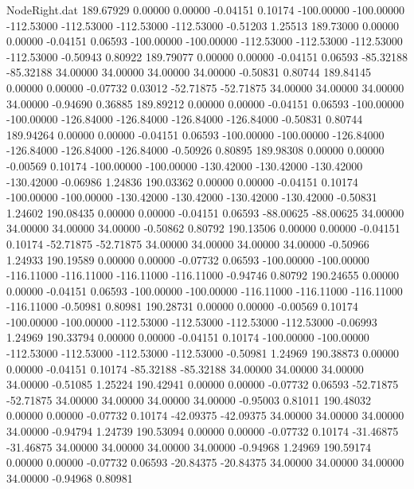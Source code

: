 \begin{filecontents}{NodeRight.dat}
 189.67929    0.00000    0.00000    -0.04151    0.10174 -100.00000 -100.00000 -112.53000 -112.53000 -112.53000 -112.53000   -0.51203    1.25513
 189.73000    0.00000    0.00000    -0.04151    0.06593 -100.00000 -100.00000 -112.53000 -112.53000 -112.53000 -112.53000   -0.50943    0.80922
 189.79077    0.00000    0.00000    -0.04151    0.06593  -85.32188  -85.32188   34.00000   34.00000   34.00000   34.00000   -0.50831    0.80744
 189.84145    0.00000    0.00000    -0.07732    0.03012  -52.71875  -52.71875   34.00000   34.00000   34.00000   34.00000   -0.94690    0.36885
 189.89212    0.00000    0.00000    -0.04151    0.06593 -100.00000 -100.00000 -126.84000 -126.84000 -126.84000 -126.84000   -0.50831    0.80744
 189.94264    0.00000    0.00000    -0.04151    0.06593 -100.00000 -100.00000 -126.84000 -126.84000 -126.84000 -126.84000   -0.50926    0.80895
 189.98308    0.00000    0.00000    -0.00569    0.10174 -100.00000 -100.00000 -130.42000 -130.42000 -130.42000 -130.42000   -0.06986    1.24836
 190.03362    0.00000    0.00000    -0.04151    0.10174 -100.00000 -100.00000 -130.42000 -130.42000 -130.42000 -130.42000   -0.50831    1.24602
 190.08435    0.00000    0.00000    -0.04151    0.06593  -88.00625  -88.00625   34.00000   34.00000   34.00000   34.00000   -0.50862    0.80792
 190.13506    0.00000    0.00000    -0.04151    0.10174  -52.71875  -52.71875   34.00000   34.00000   34.00000   34.00000   -0.50966    1.24933
 190.19589    0.00000    0.00000    -0.07732    0.06593 -100.00000 -100.00000 -116.11000 -116.11000 -116.11000 -116.11000   -0.94746    0.80792
 190.24655    0.00000    0.00000    -0.04151    0.06593 -100.00000 -100.00000 -116.11000 -116.11000 -116.11000 -116.11000   -0.50981    0.80981
 190.28731    0.00000    0.00000    -0.00569    0.10174 -100.00000 -100.00000 -112.53000 -112.53000 -112.53000 -112.53000   -0.06993    1.24969
 190.33794    0.00000    0.00000    -0.04151    0.10174 -100.00000 -100.00000 -112.53000 -112.53000 -112.53000 -112.53000   -0.50981    1.24969
 190.38873    0.00000    0.00000    -0.04151    0.10174  -85.32188  -85.32188   34.00000   34.00000   34.00000   34.00000   -0.51085    1.25224
 190.42941    0.00000    0.00000    -0.07732    0.06593  -52.71875  -52.71875   34.00000   34.00000   34.00000   34.00000   -0.95003    0.81011
 190.48032    0.00000    0.00000    -0.07732    0.10174  -42.09375  -42.09375   34.00000   34.00000   34.00000   34.00000   -0.94794    1.24739
 190.53094    0.00000    0.00000    -0.07732    0.10174  -31.46875  -31.46875   34.00000   34.00000   34.00000   34.00000   -0.94968    1.24969
 190.59174    0.00000    0.00000    -0.07732    0.06593  -20.84375  -20.84375   34.00000   34.00000   34.00000   34.00000   -0.94968    0.80981

\end{filecontents}
